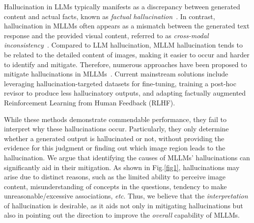 \documentclass[10pt,twocolumn,letterpaper]{article}
\begin{document}
Hallucination in LLMs typically manifests as a discrepancy between generated content and actual facts, known as \emph{factual hallucination}~\cite{bai2024}. In contrast, hallucination in MLLMs often appears as a mismatch between the generated text response and the provided visual content, referred to as \emph{cross-modal inconsistency}~\cite{bai2024}. Compared to LLM hallucination, MLLM hallucination tends to be related to the detailed content of images, making it easier to occur and harder to identify and mitigate. Therefore, numerous approaches have been proposed to mitigate hallucinations in MLLMs~\cite{sun2023, yu2024hallucidoctor}. Current mainstream solutions include leveraging hallucination-targeted datasets for fine-tuning, training a post-hoc revisor to produce less hallucinatory outputs, and adapting factually augmented Reinforcement Learning from Human Feedback (RLHF).




While these methods demonstrate commendable performance, %
they fail to interpret why these hallucinations occur. Particularly, they only determine whether a generated output is hallucinated or not, without providing the evidence for this judgment or finding out which image region leads to the hallucination. We argue that identifying the causes of MLLMs' hallucinations can significantly aid in their mitigation.
As shown in Fig.\ref{fig1}, hallucinations may arise due to distinct reasons, such as the limited ability to perceive image content, misunderstanding of concepts in the questions, tendency to make unreasonable/excessive associations, \emph{etc}. Thus, we believe that the \emph{interpretation} of hallucination is desirable, as it aids not only in mitigating hallucinations but also in pointing out the direction to improve the \emph{overall} capability of MLLMs.

\end{document}

